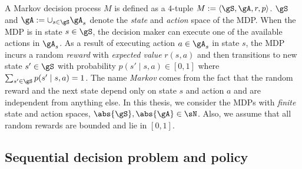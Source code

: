 A Markov decision process $M$ is defined as a $4$-tuple $M:=\langle\gS, \gA, r, p\rangle$.
$\gS$ and $\gA:=\cup_{s\in\gS}\gA_s$ denote the \emph{state} and \emph{action} space of the MDP.
When the MDP is in state $s\in\gS$, the decision maker can execute one of the available actions in $\gA_s$.
As a result of executing action $a\in\gA_s$ in state $s$, the MDP incurs a random \emph{reward} with \emph{expected value} $r(s,a)$ and then transitions to new state $s'\in\gS$ with probability $p(s'\mid s, a)\in[0,1]$ where $\sum_{s'\in\gS}p(s'\mid s,a)=1$.
The name \emph{Markov} comes from the fact that the random reward and the next state depend only on state $s$ and action $a$ and are independent from anything else.
In this thesis, we consider the MDPs with \emph{finite} state and action spaces, $\abs{\gS}, \abs{\gA}\in\sN$.
Also, we assume that all random rewards are bounded and lie in $[0,1]$.


\subsection{Sequential decision problem and policy}

